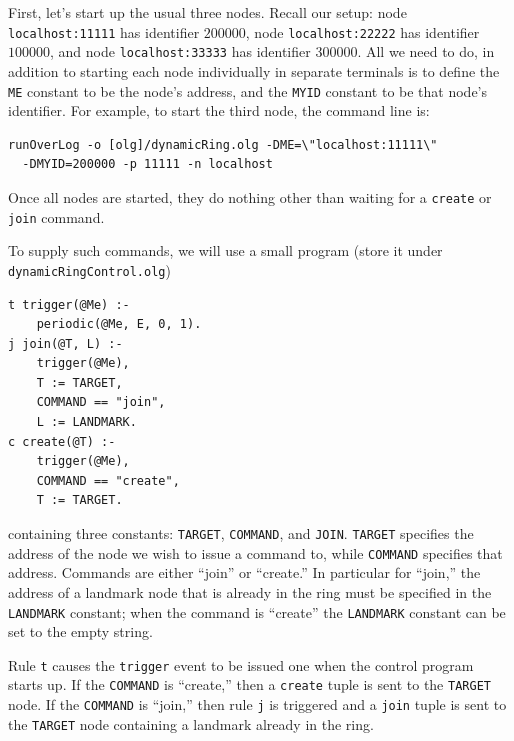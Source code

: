 \documentclass{article}
\begin{document}
First, let's start up the usual three nodes. Recall our setup: 
node \lstinline$localhost:11111$ has identifier $200000$, node
\lstinline$localhost:22222$ has identifier $100000$, and node
\lstinline$localhost:33333$ has identifier $300000$. All we need to do,
in addition to starting each node individually in separate terminals is
to define the \texttt{ME} constant to be the node's address, and the
\texttt{MYID} constant to be that node's identifier. For example, to
start the third node, the command line is:
\begin{verbatim}
runOverLog -o [olg]/dynamicRing.olg -DME=\"localhost:11111\"
  -DMYID=200000 -p 11111 -n localhost
\end{verbatim}
Once all nodes are started, they do nothing other than waiting for a
\lstinline$create$ or \lstinline$join$ command.

To supply such commands, we will use a small \ol program (store it
under \texttt{dynamicRingControl.olg})
\begin{lstlisting}
t trigger(@Me) :-
	periodic(@Me, E, 0, 1).
j join(@T, L) :-
	trigger(@Me),
	T := TARGET,
	COMMAND == "join",
	L := LANDMARK.
c create(@T) :-
	trigger(@Me),
	COMMAND == "create",
	T := TARGET.
\end{lstlisting}
containing three constants: \texttt{TARGET}, \texttt{COMMAND}, and \texttt{JOIN}.
\texttt{TARGET} specifies the address of the node we wish to issue a
command to, while \texttt{COMMAND} specifies that address. Commands are
either ``join'' or ``create.'' In particular for ``join,'' the address
of a landmark node that is already in the ring must be specified in the
\texttt{LANDMARK} constant; when the command is ``create'' the
\texttt{LANDMARK} constant can be set to the empty string.

Rule \lstinline$t$ causes the \lstinline$trigger$ event to be issued one
when the control program starts up. If the \texttt{COMMAND} is
``create,'' then a \lstinline$create$ tuple is sent to the
\texttt{TARGET} node. If the \texttt{COMMAND} is ``join,''
then rule \lstinline$j$ is triggered and a \lstinline$join$ tuple is
sent to the \texttt{TARGET} node containing a landmark already in the ring.
\end{document}
